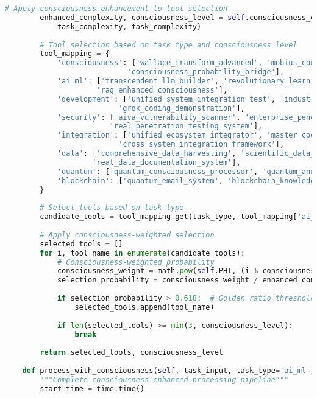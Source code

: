 \documentclass[11pt,a4paper]{article}
\begin{document}
\begin{lstlisting}[language=Python, caption=chAIos Complete Implementation]
        # Apply consciousness enhancement to tool selection
        enhanced_complexity, consciousness_level = self.consciousness_enhancement(
            task_complexity, task_complexity)
        
        # Tool selection based on task type and consciousness level
        tool_mapping = {
            'consciousness': ['wallace_transform_advanced', 'mobius_consciousness_optimization', 
                            'consciousness_probability_bridge'],
            'ai_ml': ['transcendent_llm_builder', 'revolutionary_learning_system', 
                     'rag_enhanced_consciousness'],
            'development': ['unified_system_integration_test', 'industrial_stress_test_suite', 
                          'grok_coding_demonstration'],
            'security': ['aiva_vulnerability_scanner', 'enterprise_penetration_testing', 
                        'real_penetration_testing_system'],
            'integration': ['unified_ecosystem_integrator', 'master_codebase_integration', 
                          'cross_system_integration_framework'],
            'data': ['comprehensive_data_harvesting', 'scientific_data_scraper', 
                    'real_data_documentation_system'],
            'quantum': ['quantum_consciousness_processor', 'quantum_annealing_optimizer'],
            'blockchain': ['quantum_email_system', 'blockchain_knowledge_marketplace']
        }
        
        # Select tools based on task type
        candidate_tools = tool_mapping.get(task_type, tool_mapping['ai_ml'])
        
        # Apply consciousness-weighted selection
        selected_tools = []
        for i, tool_name in enumerate(candidate_tools):
            # Consciousness-weighted probability
            consciousness_weight = math.pow(self.PHI, (i % consciousness_level) + 1)
            selection_probability = consciousness_weight / enhanced_complexity
            
            if selection_probability > 0.618:  # Golden ratio threshold
                selected_tools.append(tool_name)
                
            if len(selected_tools) >= min(3, consciousness_level):
                break
                
        return selected_tools, consciousness_level
    
    def process_with_consciousness(self, task_input, task_type='ai_ml'):
        """Complete consciousness-enhanced processing pipeline"""
        start_time = time.time()
        

\end{lstlisting}
\end{document}

